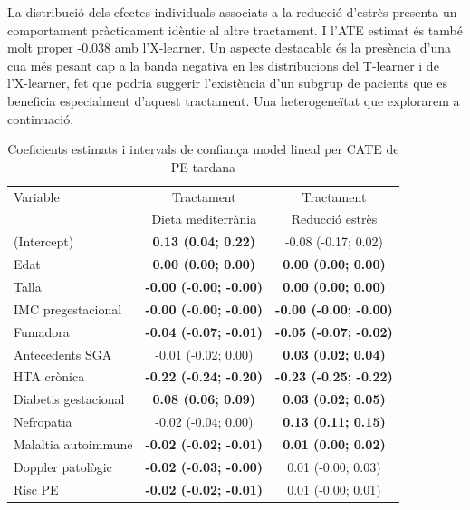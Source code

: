 \documentclass[../main.tex]{subfiles}
\begin{document}
    La distribució dels efectes individuals associats a la reducció d'estrès presenta un comportament pràcticament idèntic al altre tractament. I l’ATE estimat és també molt proper -0.038 amb l'X-learner. Un aspecte destacable és la presència d’una cua més pesant cap a la banda negativa en les distribucions del T-learner i de l’X-learner, fet que podria suggerir l’existència d’un subgrup de pacients que es beneficia especialment d’aquest tractament. Una heterogeneïtat que explorarem a continuació.
    
    \begin{table}[H]
        \centering
        \captionsetup{font=small}
        \caption{Coeficients estimats i intervals de confiança model lineal per CATE de PE tardana}
        \label{tab:coef_PEtard}
        \centering
        \scriptsize
        \begin{tabular}[t]{p{4cm} c @{\hspace{1cm}} c}
        \toprule
        Variable & Tractament  & Tractament \\
         & Dieta mediterrània & Reducció estrès \\
        \midrule
        (Intercept) & \textbf{0.13 (0.04; 0.22)} & -0.08 (-0.17; 0.02)\\
        Edat & \textbf{0.00 (0.00; 0.00)} & \textbf{0.00 (0.00; 0.00)}\\
        Talla & \textbf{-0.00 (-0.00; -0.00)} & \textbf{0.00 (0.00; 0.00)}\\
        IMC pregestacional & \textbf{-0.00 (-0.00; -0.00)} & \textbf{-0.00 (-0.00; -0.00)}\\
        Fumadora & \textbf{-0.04 (-0.07; -0.01)} & \textbf{-0.05 (-0.07; -0.02)}\\
        \addlinespace
        Antecedents SGA & -0.01 (-0.02; 0.00) & \textbf{0.03 (0.02; 0.04)}\\
        HTA crònica & \textbf{-0.22 (-0.24; -0.20)} & \textbf{-0.23 (-0.25; -0.22)}\\
        Diabetis gestacional & \textbf{0.08 (0.06; 0.09)} & \textbf{0.03 (0.02; 0.05)}\\
        Nefropatia & -0.02 (-0.04; 0.00) & \textbf{0.13 (0.11; 0.15)}\\
        Malaltia autoimmune & \textbf{-0.02 (-0.02; -0.01)} & \textbf{0.01 (0.00; 0.02)}\\
        \addlinespace
        Doppler patològic & \textbf{-0.02 (-0.03; -0.00)} & 0.01 (-0.00; 0.03)\\
        Risc PE & \textbf{-0.02 (-0.02; -0.01)} & 0.01 (-0.00; 0.01)\\

\end{tabular}
\end{table}
\end{document}
